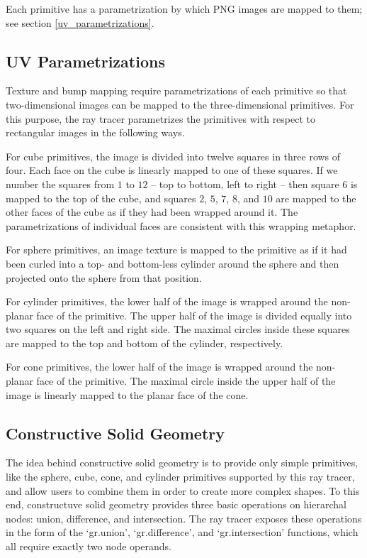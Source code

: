 \documentclass{article}
\begin{document}
Each primitive has a parametrization by which PNG images are mapped to them; see
section \ref{uv_parametrizations}.

\subsection{UV Parametrizations}

Texture and bump mapping require parametrizations of each primitive so that
two-dimensional images can be mapped to the three-dimensional primitives. For
this purpose, the ray tracer parametrizes the primitives with respect to
rectangular images in the following ways.

For cube primitives, the image is divided into twelve squares in three rows of
four. Each face on the cube is linearly mapped to one of these squares. If we
number the squares from $1$ to $12$ -- top to bottom, left to right -- then
square $6$ is mapped to the top of the cube, and squares $2$, $5$, $7$, $8$, and
$10$ are mapped to the other faces of the cube as if they had been wrapped
around it. The parametrizations of individual faces are consistent with this
wrapping metaphor.

For sphere primitives, an image texture is mapped to the primitive as if it
had been curled into a top- and bottom-less cylinder around the sphere and then
projected onto the sphere from that position.

For cylinder primitives, the lower half of the image is wrapped around the
non-planar face of the primitive. The upper half of the image is divided equally
into two squares on the left and right side. The maximal circles inside these
squares are mapped to the top and bottom of the cylinder, respectively.

For cone primitives, the lower half of the image is wrapped around the
non-planar face of the primitive. The maximal circle inside the upper half of
the image is linearly mapped to the planar face of the cone.

\subsection{Constructive Solid Geometry}

The idea behind constructive solid geometry is to provide only simple
primitives, like the sphere, cube, cone, and cylinder primitives supported by
this ray tracer, and allow users to combine them in order to create more complex
shapes. To this end, constructuve solid geometry provides three basic operations
on hierarchal nodes: union, difference, and intersection. The ray tracer exposes
these operations in the form of the `gr.union', `gr.difference', and
`gr.intersection' functions, which all require exactly two node operands.
\end{document}
